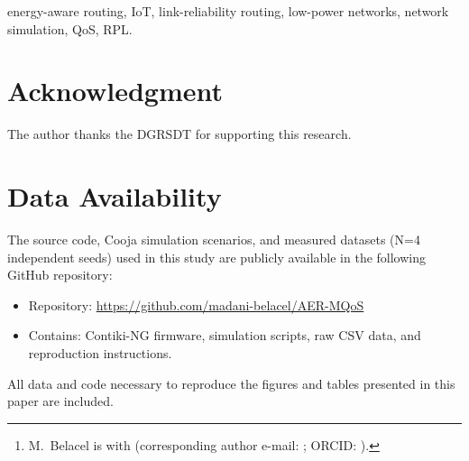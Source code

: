 





\title{\PaperTitle}

\author{\PaperAuthorName\thanks{M.~Belacel is with \PaperAffiliationOneLine{} (corresponding author e-mail: \href{mailto:\PaperCorrespondingEmail}{\PaperCorrespondingEmail}; ORCID: \href{https://orcid.org/\AuthorOrcid}{\AuthorOrcid}).}}


\maketitle

\begin{abstract}

\end{abstract}

\begin{IEEEkeywords}
energy-aware routing, IoT, link-reliability routing, low-power networks, network simulation, QoS, RPL.
\end{IEEEkeywords}

\FloatBarrier










\FloatBarrier


\FloatBarrier
\section*{Acknowledgment}
The author thanks the DGRSDT for supporting this research.

\FloatBarrier



\section*{Data Availability}
The source code, Cooja simulation scenarios, and measured datasets (N=4 independent seeds) used in this study are publicly available in the following GitHub repository:
\begin{itemize}
    \item Repository: \url{https://github.com/madani-belacel/AER-MQoS}
    \item Contains: Contiki-NG firmware, simulation scripts, raw CSV data, and reproduction instructions.
\end{itemize}
All data and code necessary to reproduce the figures and tables presented in this paper are included.

